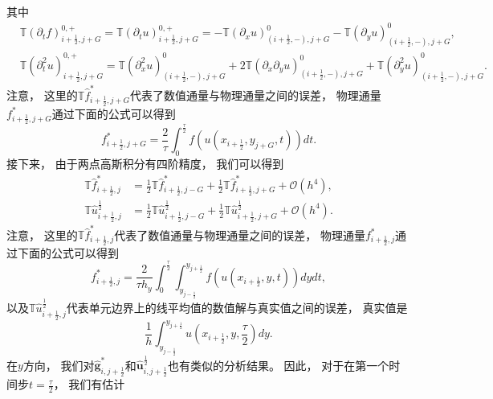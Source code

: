 其中
\begin{align}
   & {\mathbb{T}}\left({\partial_{t}} f\right)_{i+\frac 12, j+G}^{0,+} =
    {\mathbb{T}}\left({\partial_{t}} u\right)_{i+\frac 12, j+G}^{0,+} =
  -{\mathbb{T}} \left({\partial_{x}} u\right)_{(i+\frac{1}{2},-), j+G}^{0}-{\mathbb{T}} \left({\partial_{y}} u\right)_{(i+\frac{1}{2},-), j+G}^{0}, \\
   & {\mathbb{T}}\left({\partial_{t}^2} u\right)_{i+\frac 12, j+G}^{0,+} =
    {\mathbb{T}} \left({\partial_{x}^2} u\right)_{(i+\frac{1}{2},-), j+G}^{0} + 2 {\mathbb{T}} \left({\partial_{x}} {\partial_{y}} u\right)_{(i+\frac{1}{2},-), j+G}^{0} + {\mathbb{T}} \left({\partial_{y}^2} u\right)_{(i+\frac{1}{2},-), j+G}^{0}.
\end{align}
注意，
这里的${\mathbb{T}}\hat{f}^*_{i+\frac 12, j+G}$代表了数值通量与物理通量之间的误差，
物理通量$f_{i+\frac 12, j+G}^*$通过下面的公式可以得到
\begin{equation}
  f_{i+\frac 12, j+G}^* = \frac{2}{\tau}\int_{0}^{\frac\tau2} f(u(x_{i+\frac 12},y_{j+G},t)) dt.
\end{equation}
接下来，
由于两点高斯积分有四阶精度，
我们可以得到
\begin{align}
  {\mathbb{T}}\hat{f}^*_{i+\frac 12, j}           & = \frac12{\mathbb{T}}\hat{f}^*_{i+\frac 12, j-G} + \frac12{\mathbb{T}}\hat{f}^*_{i+\frac 12, j+G} + {\mathcal{O}}(h^4),                      \\
  {\mathbb{T}}\hat {u}^{\frac 12}_{i+\frac 12, j} & = \frac12{\mathbb{T}}\hat {u}^{\frac 12}_{i+\frac 12, j-G} + \frac12{\mathbb{T}}\hat {u}^{\frac 12}_{i+\frac 12, j+G} + {\mathcal{O}}(h^4).
\end{align}
注意，
这里的${\mathbb{T}}\hat{f}^*_{i+\frac 12, j}$代表了数值通量与物理通量之间的误差，
物理通量$f_{i+\frac 12, j}^*$通过下面的公式可以得到
\begin{equation}
  f_{i+\frac 12, j}^* = \frac{2}{\tau h_y}\int_{0}^{\frac\tau2} \int_{y_{j-\frac12}}^{y_{j+\frac12}} f(u(x_{i+\frac 12},y,t)) dydt,
\end{equation}
以及${\mathbb{T}}\hat {u}^{\frac 12}_{i+\frac 12, j}$代表单元边界上的线平均值的数值解与真实值之间的误差，
真实值是
\begin{equation}
  \frac{1}{h}\int_{y_{j-\frac12}}^{y_{j+\frac12}} u(x_{i+\frac 12},y,\frac\tau2) dy.
\end{equation}
在$y$方向，
我们对$\hat{\bm{g}}_{i, j+\frac 12}^*$和$\hat {\bm{u}}_{i, j+\frac 12}^{\frac 12}$也有类似的分析结果。
因此，
对于在第一个时间步$t=\frac \tau 2$，
我们有估计
